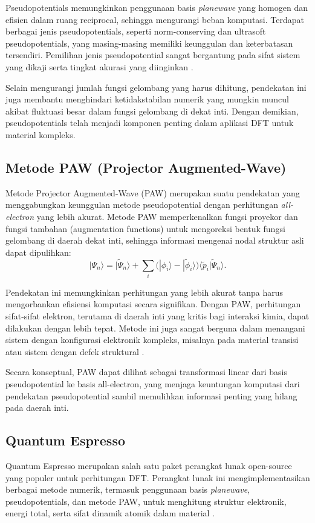Pseudopotentials memungkinkan penggunaan basis \emph{planewave} yang homogen dan efisien dalam ruang reciprocal, sehingga mengurangi beban komputasi. Terdapat berbagai jenis pseudopotentials, seperti norm-conserving dan ultrasoft pseudopotentials, yang masing-masing memiliki keunggulan dan keterbatasan tersendiri. Pemilihan jenis pseudopotential sangat bergantung pada sifat sistem yang dikaji serta tingkat akurasi yang diinginkan \citep{payne_iterative_1992}.

Selain mengurangi jumlah fungsi gelombang yang harus dihitung, pendekatan ini juga membantu menghindari ketidakstabilan numerik yang mungkin muncul akibat fluktuasi besar dalam fungsi gelombang di dekat inti. Dengan demikian, pseudopotentials telah menjadi komponen penting dalam aplikasi DFT untuk material kompleks.

\subsection{Metode PAW (Projector Augmented-Wave)}
Metode Projector Augmented-Wave (PAW) merupakan suatu pendekatan yang menggabungkan keunggulan metode pseudopotential dengan perhitungan \emph{all-electron} yang lebih akurat. Metode PAW memperkenalkan fungsi proyekor dan fungsi tambahan (augmentation functions) untuk mengoreksi bentuk fungsi gelombang di daerah dekat inti, sehingga informasi mengenai nodal struktur asli dapat dipulihkan:
\begin{equation}
    |\Psi_n\rangle = |\tilde{\Psi}_n\rangle + \sum_i \Big(|\phi_i\rangle - |\tilde{\phi}_i\rangle\Big) \langle \tilde{p}_i | \tilde{\Psi}_n \rangle.
\end{equation}

Pendekatan ini memungkinkan perhitungan yang lebih akurat tanpa harus mengorbankan efisiensi komputasi secara signifikan. Dengan PAW, perhitungan sifat-sifat elektron, terutama di daerah inti yang kritis bagi interaksi kimia, dapat dilakukan dengan lebih tepat. Metode ini juga sangat berguna dalam menangani sistem dengan konfigurasi elektronik kompleks, misalnya pada material transisi atau sistem dengan defek struktural \citep{blochl_projector_1994}.

Secara konseptual, PAW dapat dilihat sebagai transformasi linear dari basis pseudopotential ke basis all-electron, yang menjaga keuntungan komputasi dari pendekatan pseudopotential sambil memulihkan informasi penting yang hilang pada daerah inti.

\subsection{Quantum Espresso}
Quantum Espresso merupakan salah satu paket perangkat lunak open-source yang populer untuk perhitungan DFT. Perangkat lunak ini mengimplementasikan berbagai metode numerik, termasuk penggunaan basis \emph{planewave}, pseudopotentials, dan metode PAW, untuk menghitung struktur elektronik, energi total, serta sifat dinamik atomik dalam material \citep{giannozzi_quantum_2009}.

